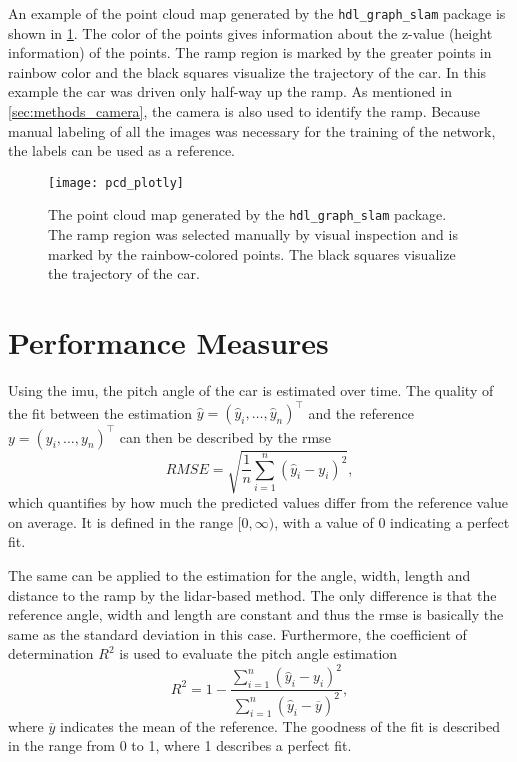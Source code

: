 An example of the point cloud map generated by the \texttt{hdl\_graph\_slam} package is shown in \cref{fig:pcd_plotly}.
The color of the points gives information about the z-value (height information) of the points.
The ramp region is marked by the greater points in rainbow color and the black squares visualize the trajectory of the car.
In this example the car was driven only half-way up the ramp.
As mentioned in \cref{sec:methods_camera}, the camera is also used to identify the ramp.
Because manual labeling of all the images was necessary for the training of the network, the labels can be used as a reference.
\begin{figure}[htb]
    \centering
    \texttt{[image: pcd\_plotly]}
    \caption[Generated point cloud map]{The point cloud map generated by the \texttt{hdl\_graph\_slam} package. The ramp region was selected manually by visual inspection and is marked by the rainbow-colored points. The black squares visualize the trajectory of the car.}
    \label{fig:pcd_plotly}
\end{figure}



\section{Performance Measures}
\label{sec:performance_measures}
Using the \gls{imu}, the pitch angle of the car is estimated over time.
The quality of the fit between the estimation $\hat{y} = (\hat{y}_i, \dots, \hat{y}_n)^\intercal$ and the reference $y = (y_i, \dots, y_n)^\intercal$ can then be described by the \gls{rmse}
\begin{equation}
    RMSE = \sqrt{\frac{1}{n}\sum_{i = 1}^n(\hat{y}_i - y_i)^2},
\end{equation}
which quantifies by how much the predicted values differ from the reference value on average.
It is defined in the range $[0, \infty)$, with a value of 0 indicating a perfect fit.

The same can be applied to the estimation for the angle, width, length and distance to the ramp by the \gls{lidar}-based method.
The only difference is that the reference angle, width and length are constant and thus the \gls{rmse} is basically the same as the standard deviation in this case.
Furthermore, the coefficient of determination $R^2$ is used to evaluate the pitch angle estimation
\begin{equation}
    R^2 = 1 - \frac{\sum\limits_{i = 1}^n(\hat{y}_i - y_i)^2}{\sum\limits_{i = 1}^n(\hat{y}_i - \overline{y})^2},
\end{equation}
where $\overline{y}$ indicates the mean of the reference.
The goodness of the fit is described in the range from 0 to 1, where 1 describes a perfect fit.

